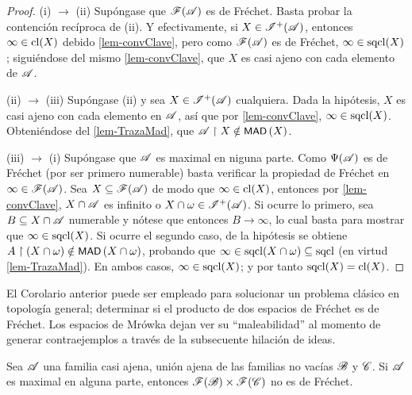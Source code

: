 	\begin{proof}
		(i) $\to$ (ii) Supóngase que $\mathscr{F}(\mathscr{A})$ es de Fréchet. Basta probar la contención recíproca de (ii). Y efectivamente, si $X \in \mathscr{I}^+(\mathscr{A})$, entonces $\infty \in \operatorname{cl}(X)$ debido \ref{lem-convClave}, pero como $\mathscr{F}(\mathscr{A})$ es de Fréchet, $\infty \in \operatorname{sqcl}(X)$; siguiéndose del mismo \autoref{lem-convClave}, que $X$ es casi ajeno con cada elemento de $\mathscr{A}$.

		(ii) $\to$ (iii) Supóngase (ii) y sea $X \in \mathscr{I}^+(\mathscr{A})$ cualquiera. Dada la hipótesis, $X$ es casi ajeno con cada elemento en $\mathscr{A}$, así que por \ref{lem-convClave}, $\infty \in \operatorname{sqcl}(X)$. Obteniéndose del \autoref{lem-TrazaMad}, que $\mathscr{A} \upharpoonright X \notin \operatorname{\text{\textsf{\small MAD}}}\,(X)$.

		(iii) $\to$ (i) Supóngase que $\mathscr{A}$ es maximal en niguna parte. Como $\Psi(\mathscr{A})$ es de Fréchet (por ser primero numerable) basta verificar la propiedad de Fréchet en $\infty \in \mathscr{F}(\mathscr{A})$. Sea $X \subseteq \mathscr{F}(\mathscr{A})$ de modo que $\infty \in \operatorname{cl}(X)$, entonces por \ref{lem-convClave}, $X \cap \mathscr{A}$ es infinito o $X \cap \omega \in \mathscr{I}^+(\mathscr{A})$. Si ocurre lo primero, sea $B \subseteq X \cap \mathscr{A}$ numerable y nótese que entonces $B \to \infty$, lo cual basta para mostrar que $\infty \in \operatorname{sqcl}(X)$. Si ocurre el segundo caso, de la hipótesis se obtiene $A \upharpoonright (X \cap \omega) \notin \operatorname{\text{\textsf{\small MAD}}}\,(X \cap \omega)$, probando que $\infty \in \operatorname{sqcl}(X \cap \omega) \subseteq \operatorname{sqcl}$ (en virtud \ref{lem-TrazaMad}). En ambos casos, $\infty \in \operatorname{sqcl}(X)$; y por tanto $\operatorname{sqcl}(X)=\operatorname{cl}(X)$.
	\end{proof}

	El Corolario anterior puede ser empleado para solucionar un problema clásico en topología general; determinar si el producto de dos espacios de Fréchet es de Fréchet. Los espacios de Mrówka dejan ver su ``maleabilidad'' al momento de generar contraejemplos a través de la subsecuente hilación de ideas.

	\begin{proposicion}
		Sea $\mathscr{A}$ una familia casi ajena, unión ajena de las familias no vacías $\mathscr{B}$ y $\mathscr{C}$. Si $\mathscr{A}$ es maximal en alguna parte, entonces $\mathscr{F}(\mathscr{B}) \times \mathscr{F}(\mathscr{C})$ no es de Fréchet.
	\end{proposicion}


